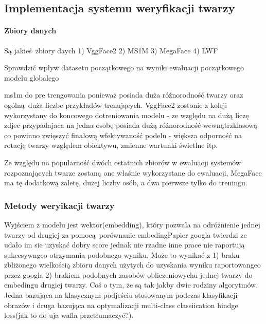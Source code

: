 
\subsection{Implementacja systemu weryfikacji twarzy}

\paragraph{Zbiory danych}
Są jakieś zbiory daych 
1) VggFace2
2) MS1M
3) MegaFace
4) LWF

Sprawdzić wpływ datasetu początkowego na wyniki ewaluacji początkowego modelu globalego

ms1m do pre trengowania ponieważ posiada duża różnorodność twarzy oraz ogólną duża liczbe przykładów trenujących. VggFace2 zostonie z koleji wykorzystany do koncowego dotreniowania modelu - ze względu na dużą liczę zdjec przypadajaca na jedna osobę posiada dużą różnorodność wewnątrzklasową co powinno zwięszyć finałową wfektywaność podelu - większa odporność na rotację twarzy względem obiektywu, zmienne wartunki świetlne itp.

Ze względu na popularność dwóch ostatnich zbiorów w ewaluacji systemów rozpoznających twarze zostaną one właśnie wykorzystane do ewaluacji, MegaFace ma tę dodatkową zaletę, dużej liczby osób, a dwa pierwsze tylko do treningu.



\subsubsection{Metody weryikacji twarzy}
Wyjściem z modelu jest wektor(embedding), który pozwala na odróżnienie jednej twarzy od drugiej za pomocą porównanie 
embedingPapier googla twierdzi ze udało im sie uzyskać dobry score jednak nie rzadne inne prace nie raportują sukcesywngeo otrzymania podobnego wyniku. Może to wynikać z 1) braku zbliżonego wielkością zbioru danych użytych do uzyskania wyniku raportowangeo przez googla  2) brakiem podobnych zasobów obliczeniowychu jednej twarzy do embedingu drugiej twarzy.
Coś o tym, że są tak jakby dwie rodziny algorytmów. Jedna bazująca na klasycznym podjeściu stosowanym podczas klasyfikacji obrazów i druga bazująca na optymalizacji multi-class classiication hindge loss(jak to do uja wafla przetłumaczyć?).

